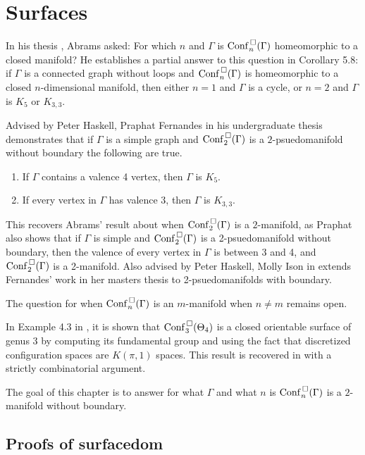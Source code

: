 \chapter{Surfaces}
In his thesis \cite{abrams2000configurationspaces}, Abrams asked:
For which \(n\) and \(\Gamma\) is \(\mathrm{Conf}^{\,\square}_n(\Gamma)\) homeomorphic to a closed manifold?
He establishes a partial answer to this question in Corollary 5.8: 
if \(\Gamma\) is a connected graph
without loops and \(\mathrm{Conf}^{\,\square}_n(\Gamma)\) is homeomorphic to a closed
\(n\)-dimensional manifold, then either \(n = 1\) and \(\Gamma\) is a cycle, or
\(n = 2\) and \(\Gamma\) is \(K_5\) or \(K_{3,3}\).

Advised by Peter Haskell, Praphat Fernandes in his undergraduate thesis
demonstrates that if \(\Gamma\) is a simple graph and \(\mathrm{Conf}^{\,\square}_2(\Gamma)\)
is a \(2\)-psuedomanifold without boundary the following are true.
\begin{enumerate}
    \item If \(\Gamma\) contains a valence 4 vertex, then \(\Gamma\) is \(K_5\).
    \item If every vertex in \(\Gamma\) has valence 3, then \(\Gamma\) is \(K_{3,3}\).
\end{enumerate}
This recovers Abrams' result about when \(\mathrm{Conf}^{\,\square}_2(\Gamma)\) 
is a \(2\)-manifold, as Praphat also shows that
if \(\Gamma\) is simple and \(\mathrm{Conf}^{\,\square}_2(\Gamma)\) is a 2-psuedomanifold without boundary,
then the valence of every vertex in \(\Gamma\) is between 3 and 4,
and \(\mathrm{Conf}^{\,\square}_2(\Gamma)\) is a 2-manifold. Also advised by Peter Haskell, Molly Ison in \cite{ison2005two} 
extends Fernandes' work in her masters thesis to 2-psuedomanifolds with boundary.

The question for when \(\mathrm{Conf}^{\,\square}_n(\Gamma)\) is an \(m\)-manifold 
when \(n \neq m\) remains open.

In Example 4.3 in \cite{ko2012characteristics}, it is shown that \(\mathrm{Conf}^{\,\square}_3(\Theta_4)\)
is a closed orientable surface of genus 3 by computing its fundamental group and using the
fact that discretized configuration spaces are \(K(\pi, 1)\) spaces.
This result is recovered in \cite{appiah2024algebraicstructurehyperbolicgraph}
with a strictly combinatorial argument.

The goal of this chapter is to
answer for what \(\Gamma\) and what \(n\) is
\(\mathrm{Conf}^{\,\square}_n(\Gamma)\) is a \(2\)-manifold without boundary.

\section{Proofs of surfacedom}

